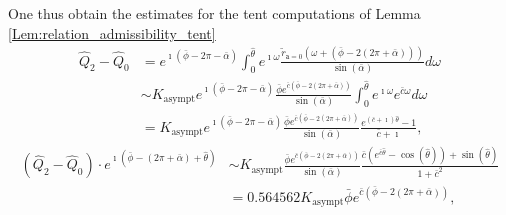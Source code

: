 \documentclass[reqno]{amsart}
\theoremstyle{definition} \newtheorem{definition}{Definition}[section]
\theoremstyle{definition} \newtheorem{remark}[definition]{Remark}
\theoremstyle{plain} \newtheorem{lemma}[definition]{Lemma}
\theoremstyle{plain} \newtheorem{proposition}[definition]{Proposition}
\theoremstyle{plain} \newtheorem{theorem}[definition]{Theorem}
\theoremstyle{plain} \newtheorem{corollary}[definition]{Corollary}
\theoremstyle{definition} \newtheorem{example}[definition]{Example}
\theoremstyle{plain} \newtheorem{claim}[clai]{Claim}
\theoremstyle{definition} \newtheorem{assumption}[definition]{Assumption}
\theoremstyle{definition} \newtheorem{observation}[definition]{Observation}
\newcommand{\1}{\mathbbm 1}
\renewcommand{\i}{\imath}
\numberwithin{equation}{section} %
\theoremstyle{plain} \newtheorem*{theorem*}{Theorem}
\theoremstyle{plain} \newtheorem{mthm}[maintheorem]{Main Theorem}
\theoremstyle{plain} \newtheorem*{mthm*}{Main Theorem}
\theoremstyle{plain} \newtheorem*{conjecture*}{Conjecture}
\theoremstyle{plain} \newtheorem{conjecture}[definition]{Conjecture}
\theoremstyle{plain} \newtheorem*{problem*}{Problem}
\begin{document}
One thus obtain the estimates for the tent computations of Lemma \ref{Lem:relation_admissibility_tent} %
\begin{align*}
\hat Q_2 - \hat Q_0 &= e^{\i (\bar \phi - 2\pi - \bar \alpha)} \int_0^{\hat \theta} e^{\i \omega} \frac{\tilde r_{\mathtt a = 0}(\omega + (\bar \phi - 2(2\pi + \bar \alpha)))}{\sin(\bar \alpha)} d\omega \\
&\sim K_\mathrm{asympt} e^{\i (\bar \phi - 2\pi - \bar \alpha)} \frac{\bar \phi e^{\bar c (\bar \phi - 2(2\pi + \bar \alpha))}}{\sin(\bar \alpha)} \int_0^{\hat \theta} e^{\i \omega} e^{\bar c \omega} d\omega \\
&= K_\mathrm{asympt} e^{\i (\bar \phi - 2\pi - \bar \alpha)} \frac{\bar \phi e^{\bar c (\bar \phi - 2(2\pi + \bar \alpha))}}{\sin(\bar \alpha)} \frac{e^{(\bar c + \i) \hat \theta} - 1}{\bar c + \i}, %
\end{align*}
\begin{align*}
(\hat Q_2 - \hat Q_0) \cdot e^{\i (\bar \phi - (2\pi + \bar \alpha) + \hat \theta)} &\sim K_\mathrm{asympt} \frac{\bar \phi e^{\bar c (\bar \phi - 2(2\pi + \bar \alpha))}}{\sin(\bar \alpha)} \frac{\bar c (e^{\bar c \hat \theta} - \cos(\hat \theta)) + \sin(\hat \theta)}{1 + \bar c^2} \\
&= 0.564562 K_\mathrm{asympt} \bar \phi e^{\bar c (\bar \phi - 2(2\pi + \bar \alpha))},
\end{align*}
\end{document}
